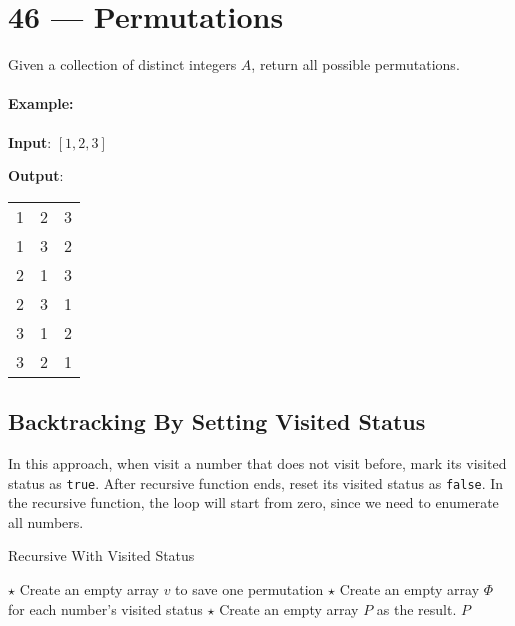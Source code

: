 \section{46 --- Permutations}
Given a collection of distinct integers $A$, return all possible permutations.

\paragraph{Example:}

\begin{flushleft}
\textbf{Input}: $[1,2,3]$

\textbf{Output}:

\begin{table}[H]
\begin{tabular}{ccc}
1 & 2 & 3\\
1 & 3 & 2\\
2 & 1 & 3\\
2 & 3 & 1\\
3 & 1 & 2\\
3 & 2 & 1
\end{tabular}
\end{table}
\end{flushleft}

\subsection{Backtracking By Setting Visited Status}
In this approach, when visit a number that does not visit before, mark its visited status as \texttt{true}. After recursive function ends, reset its visited status as \texttt{false}. In the recursive function, the loop will start from zero, since we need to enumerate all numbers.

\setcounter{algorithm}{0}
\begin{algorithm}[H]
\caption{Recursive With Visited Status}
\begin{algorithmic}[1]
\State $\star$ Create an empty array $v$ to save one permutation
\State $\star$ Create an empty array $\Phi$ for each number's visited status
\State $\star$ Create an empty array $P$ as the result.
\State {} 
\State \Return $P$
\EndProcedure
\end{algorithmic}
\end{algorithm}

